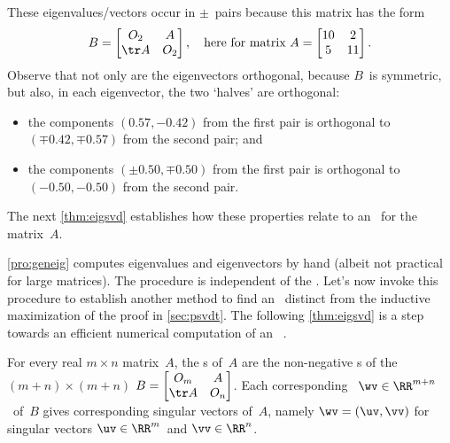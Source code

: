 \begin{example}
\begin{solution}
These eigenvalues\slash vectors occur in \(\pm\)~pairs because this matrix has the form
\begin{equation*}
B=\begin{bmatrix} O_2& A\\ \tr A&O_2\end{bmatrix},
\quad\text{here for matrix }
A=\begin{bmatrix} 10&2\\5&11 \end{bmatrix}.
\end{equation*}
Observe that not only are the eigenvectors orthogonal, because \(B\)~is symmetric, but also, in each eigenvector, the two `halves' are orthogonal:  
\begin{itemize}
\item the components \((0.57,-0.42)\) from the first pair is orthogonal to \((\mp0.42,\mp0.57)\) from the second pair; and 
\item the components \((\pm0.50,\mp0.50)\) from the first pair is orthogonal to \((-0.50,-0.50)\) from the second pair.
\end{itemize}
The next \cref{thm:eigsvd} establishes how these properties relate to an \svd\ for the matrix~\(A\).
\end{solution}
\end{example}


\cref{pro:geneig} computes eigenvalues and eigenvectors by hand (albeit not practical for large matrices). 
The procedure is independent of the \svd.
Let's now invoke this procedure to establish another method to find an \svd\ distinct from the inductive maximization of the proof in \cref{sec:psvdt}. 
The following \cref{thm:eigsvd} is a step towards an efficient numerical computation of an \svd\ \cite[p.234]{Trefethen1997}.



\begin{theorem} \label{thm:eigsvd}
For every real \(m\times n\) matrix~\(A\), the s of~\(A\) are the non-negative s of the \((m+n)\times(m+n)\)  \(B=\begin{bmatrix} O_m&A\\\tr A&O_n \end{bmatrix}\). 
Each corresponding ~\(\wv\in\RR^{m+n}\)\ of~\(B\) gives corresponding  singular vectors of~\(A\), namely \(\wv=(\uv,\vv)\) for singular vectors \(\uv\in\RR^m\)\ and \(\vv\in\RR^n\). 
\end{theorem}


